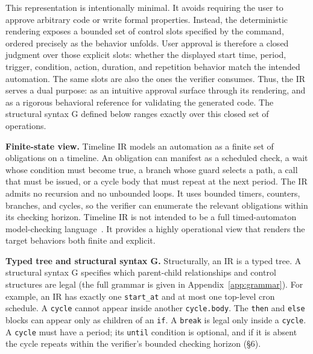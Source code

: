 \documentclass[sigconf,nonacm,anonymous,review]{acmart}
\begin{document}
This representation is intentionally minimal. It avoids requiring the user to approve arbitrary code or write formal properties. %
Instead, the deterministic rendering exposes a bounded set of control slots specified by the command, ordered precisely as the behavior unfolds. User approval is therefore a closed judgment over those explicit slots: whether the displayed start time, period, trigger, condition, action, duration, and repetition behavior match the intended automation. The same slots are also the ones the verifier consumes. Thus, the IR serves a dual purpose: as an intuitive approval surface through its rendering, and as a rigorous behavioral reference for validating the generated code. %
The structural syntax G defined below ranges exactly over this closed set of operations.

\textbf{Finite-state view.} Timeline IR models an automation as a finite set of obligations on a timeline. An obligation can manifest as a scheduled check, a wait whose condition must become true, a branch whose guard selects a path, a call that must be issued, or a cycle body that must repeat at the next period. The IR admits no recursion and no unbounded loops. It uses bounded timers, counters, branches, and cycles, so the verifier can enumerate the relevant obligations within its checking horizon. Timeline IR is not intended to be a full timed-automaton model-checking language~\cite{timedautomata}. It provides a highly operational view that renders the target behaviors both finite and explicit. %

\textbf{Typed tree and structural syntax G.} Structurally, an IR is a typed tree. A structural syntax G specifies which parent-child relationships and control structures are legal (the full grammar is given in Appendix~\ref{app:grammar}). For example, an IR has exactly one \texttt{start\_at} and at most one top-level cron schedule. A \texttt{cycle} cannot appear inside another \texttt{cycle.body}. The \texttt{then} and \texttt{else} blocks can appear only as children of an \texttt{if}. A \texttt{break} is legal only inside a \texttt{cycle}. A \texttt{cycle} must have a period; its \texttt{until} condition is optional, and if it is absent the cycle repeats within the verifier's bounded checking horizon (\S6).
\end{document}
